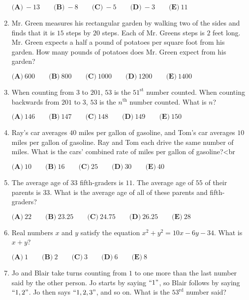 \documentclass{article}
\begin{document}
\begin{enumerate}[label=\arabic*., itemsep=0.5em]
\(\textbf{(A)}\ -13 \qquad \textbf{(B)}\ -8 \qquad \textbf{(C)}\ -5 \qquad \textbf{(D)}\ -3 \qquad \textbf{(E)}\ 11\)\par \vspace{0.5em}\item Mr. Green measures his rectangular garden by walking two of the sides and finds that it is \(15\) steps by \(20\) steps. Each of Mr. Greens steps is \(2\) feet long. Mr. Green expects a half a pound of potatoes per square foot from his garden. How many pounds of potatoes does Mr. Green expect from his garden?

\(\textbf{(A)}\ 600 \qquad \textbf{(B)}\ 800 \qquad \textbf{(C)}\ 1000 \qquad \textbf{(D)}\ 1200 \qquad \textbf{(E)}\ 1400\)\par \vspace{0.5em}\item When counting from \(3\) to \(201\), \(53\) is the \(51^{\text{st}}\) number counted. When counting backwards from \(201\) to \(3\), \(53\) is the \(n^{\text{th}}\) number counted. What is \(n\)?

\(\textbf{(A)}\ 146 \qquad \textbf{(B)}\ 147 \qquad \textbf{(C)}\ 148 \qquad \textbf{(D)}\ 149 \qquad \textbf{(E)}\ 150\)\par \vspace{0.5em}\item Ray's car averages \(40\) miles per gallon of gasoline, and Tom's car averages \(10\) miles per gallon of gasoline. Ray and Tom each drive the same number of miles. What is the cars' combined rate of miles per gallon of gasoline?<br \>

\(\textbf{(A)}\ 10 \qquad \textbf{(B)}\ 16 \qquad \textbf{(C)}\ 25 \qquad \textbf{(D)}\ 30 \qquad \textbf{(E)}\ 40\)\par \vspace{0.5em}\item The average age of \(33\) fifth-graders is \(11\). The average age of \(55\) of their parents is \(33\). What is the average age of all of these parents and fifth-graders?

\(\textbf{(A)}\ 22 \qquad \textbf{(B)}\ 23.25 \qquad \textbf{(C)}\ 24.75 \qquad \textbf{(D)}\ 26.25 \qquad \textbf{(E)}\ 28\)\par \vspace{0.5em}\item Real numbers \(x\) and \(y\) satisfy the equation \(x^2 + y^2 = 10x - 6y - 34\). What is \(x + y\)?

\(\textbf{(A)}\ 1 \qquad \textbf{(B)}\ 2 \qquad \textbf{(C)}\ 3 \qquad \textbf{(D)}\ 6 \qquad \textbf{(E)}\ 8\)\par \vspace{0.5em}\item Jo and Blair take turns counting from \(1\) to one more than the last number said by the other person. Jo starts by saying \(``1"\), so Blair follows by saying \(``1, 2"\). Jo then says \(``1, 2, 3"\), and so on. What is the \(53^{\text{rd}}\) number said?


\end{enumerate}
\end{document}
